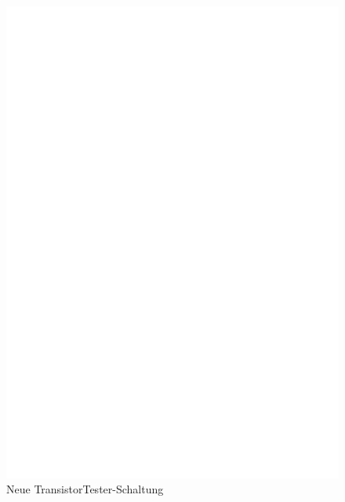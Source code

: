 \begin{figure}[H]
\centering
\includegraphics[width=18cm]{../FIG/ttester.eps}
\caption{Neue TransistorTester-Schaltung}
\label{fig:ttester}
\end{figure}


